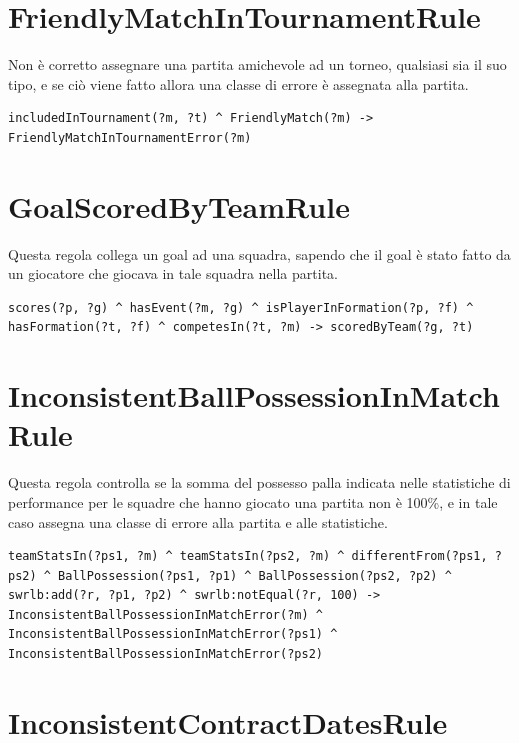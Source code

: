 \documentclass[11pt]{report} %
\begin{document}
\section{FriendlyMatchInTournamentRule}

Non è corretto assegnare una partita amichevole ad un torneo, qualsiasi sia il suo tipo, e se ciò viene fatto allora una classe di errore è assegnata alla partita. 

\begin{lstlisting}[language=SWRL]
includedInTournament(?m, ?t) ^ FriendlyMatch(?m) -> FriendlyMatchInTournamentError(?m)
\end{lstlisting}

\section{GoalScoredByTeamRule}

Questa regola collega un goal ad una squadra, sapendo che il goal è stato fatto da un giocatore che giocava in tale squadra nella partita.

\begin{lstlisting}[language=SWRL]
scores(?p, ?g) ^ hasEvent(?m, ?g) ^ isPlayerInFormation(?p, ?f) ^ hasFormation(?t, ?f) ^ competesIn(?t, ?m) -> scoredByTeam(?g, ?t)
\end{lstlisting}

\section{InconsistentBallPossessionInMatchRule}

Questa regola controlla se la somma del possesso palla indicata nelle statistiche di performance per le squadre che hanno giocato una partita non è 100\%, e in tale caso assegna una classe di errore alla partita e alle statistiche.

\begin{lstlisting}[language=SWRL]
teamStatsIn(?ps1, ?m) ^ teamStatsIn(?ps2, ?m) ^ differentFrom(?ps1, ?ps2) ^ BallPossession(?ps1, ?p1) ^ BallPossession(?ps2, ?p2) ^ swrlb:add(?r, ?p1, ?p2) ^ swrlb:notEqual(?r, 100) -> InconsistentBallPossessionInMatchError(?m) ^ InconsistentBallPossessionInMatchError(?ps1) ^ InconsistentBallPossessionInMatchError(?ps2)
\end{lstlisting}

\section{InconsistentContractDatesRule}
\end{document}
